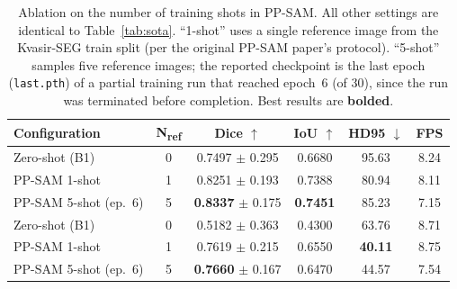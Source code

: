 
\begin{table}[ht]
\centering
\caption{Ablation on the number of training shots in PP-SAM.
All other settings are identical to Table~\ref{tab:sota}.
``1-shot'' uses a single reference image from the Kvasir-SEG train split
(per the original PP-SAM paper's protocol).
``5-shot'' samples five reference images; the reported checkpoint is the
last epoch (\texttt{last.pth}) of a partial training run that reached
epoch~6 (of 30), since the run was terminated before completion.
Best results are \textbf{bolded}.}
\label{tab:shot-ablation}
\begin{tabular}{l c c c c c}
\toprule
\textbf{Configuration} & \textbf{N\textsubscript{ref}} & \textbf{Dice} $\uparrow$ & \textbf{IoU} $\uparrow$ & \textbf{HD95} $\downarrow$ & \textbf{FPS} \\
\midrule
Zero-shot (B1)            & 0 & 0.7497 $\pm$ 0.295 & 0.6680 & 95.63 & 8.24 \\
PP-SAM 1-shot             & 1 & 0.8251 $\pm$ 0.193 & 0.7388 & 80.94 & 8.11 \\
PP-SAM 5-shot (ep.~6)     & 5 & \textbf{0.8337} $\pm$ 0.175 & \textbf{0.7451} & 85.23 & 7.15 \\
\midrule
Zero-shot (B1)            & 0 & 0.5182 $\pm$ 0.363 & 0.4300 & 63.76 & 8.71 \\
PP-SAM 1-shot             & 1 & 0.7619 $\pm$ 0.215 & 0.6550 & \textbf{40.11} & 8.75 \\
PP-SAM 5-shot (ep.~6)     & 5 & \textbf{0.7660} $\pm$ 0.167 & 0.6470 & 44.57 & 7.54 \\
\bottomrule
\end{tabular}
\end{table}
